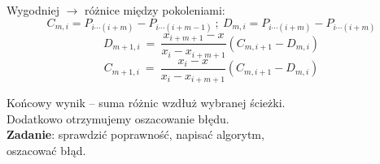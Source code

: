 \begin{frame}


Wygodniej $\rightarrow$ różnice między pokoleniami:
$$
C_{m,i}=P_{i\cdots(i+m)}-P_{i\cdots(i+m-1)}\ ;\ D_{m,i}=P_{i\cdots(i+m)}-P_{i\cdots(i+m)}
$$
$$
D_{m+1,i}\ =\ \frac{x_{i+m+1}-x}{x_{i}-x_{i+m+1}}(C_{m,i+1}-D_{m,i})
$$
$$
C_{m+1,i}\ =\ \frac{x_{i}-x}{x_{i}-x_{i+m+1}}(C_{m,i+1}-D_{m,i})
$$
\vspace{3mm}

Końcowy wynik -- suma różnic wzdłuż wybranej ścieżki. \\
Dodatkowo otrzymujemy oszacowanie błędu. \\
\vspace{3mm}
\textbf{Zadanie}: sprawdzić poprawność, napisać algorytm, \\
oszacować błąd.
\end{frame}